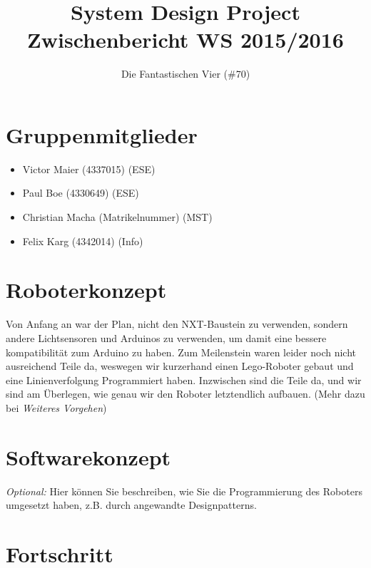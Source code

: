 \documentclass[11pt,a4paper]{article}
\title{
  \Huge System Design Project \\
  \LARGE Zwischenbericht WS 2015/2016
}
\author{
  \Large Die Fantastischen Vier (\#70) \\
}
\begin{document}
\maketitle

\section{Gruppenmitglieder}
\begin{itemize}
  \item Victor Maier (4337015) (ESE)
  \item Paul Boe (4330649) (ESE)
  \item Christian Macha (Matrikelnummer) (MST)
  \item Felix Karg (4342014) (Info)
\end{itemize}

\section{Roboterkonzept}

Von Anfang an war der Plan, nicht den NXT-Baustein zu verwenden, sondern andere Lichtsensoren
und Arduinos zu verwenden, um damit eine bessere kompatibilität zum Arduino zu haben. Zum Meilenstein waren leider noch nicht ausreichend Teile da, weswegen wir kurzerhand
einen Lego-Roboter gebaut und eine Linienverfolgung Programmiert haben. Inzwischen sind die Teile
da, und wir sind am Überlegen, wie genau wir den Roboter letztendlich aufbauen. 
(Mehr dazu bei \emph{Weiteres Vorgehen})

\section{Softwarekonzept}

\emph{Optional:} Hier können Sie beschreiben, wie Sie die Programmierung des Roboters umgesetzt haben, z.B. durch angewandte Designpatterns.

\section{Fortschritt}
\end{document}
